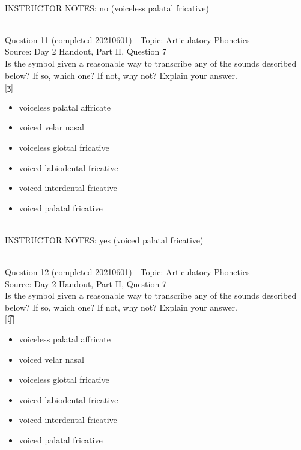 \documentclass[12pt]{article}
\begin{document}
~\\
INSTRUCTOR NOTES: no (voiceless palatal fricative)


~\\

{\large Question 11} (completed 20210601) - Topic: Articulatory Phonetics\\
Source: Day 2 Handout, Part II, Question 7\\

Is the symbol given a reasonable way to transcribe any of the sounds described below? If so, which one? If not, why not? Explain your answer.\\

{[ʒ]}

\begin{itemize} \item voiceless palatal affricate \item voiced velar nasal \item voiceless glottal fricative \item voiced labiodental fricative \item voiced interdental fricative \item voiced palatal fricative \end{itemize}


~\\
INSTRUCTOR NOTES: yes (voiced palatal fricative)


~\\

{\large Question 12} (completed 20210601) - Topic: Articulatory Phonetics\\
Source: Day 2 Handout, Part II, Question 7\\

Is the symbol given a reasonable way to transcribe any of the sounds described below? If so, which one? If not, why not? Explain your answer.\\

{[t͡ʃ]}

\begin{itemize} \item voiceless palatal affricate \item voiced velar nasal \item voiceless glottal fricative \item voiced labiodental fricative \item voiced interdental fricative \item voiced palatal fricative \end{itemize}
\end{document}
